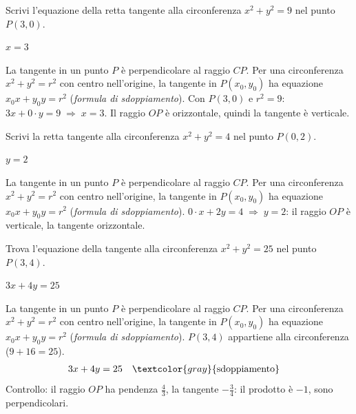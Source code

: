 \begin{question}[ID=4.1, subtitle={Tangente a $x^2+y^2=9$ nel punto $P(3,0)$}, difficulty=facile, tags={tangente, circonferenza, punto}]
Scrivi l'equazione della retta tangente alla circonferenza $x^2+y^2=9$ nel punto $P(3,0)$.
\begin{solution}
$x=3$
\end{solution}
\begin{explanation}
La tangente in un punto $P$ è perpendicolare al raggio $CP$. Per una circonferenza $x^2+y^2=r^2$ con centro nell'origine, la tangente in $P(x_0,y_0)$ ha equazione $x_0x+y_0y=r^2$ (\emph{formula di sdoppiamento}).
Con $P(3,0)$ e $r^2=9$: \ $3x+0\cdot y=9 \;\Rightarrow\; x=3$. Il raggio $OP$ è orizzontale, quindi la tangente è verticale.
\end{explanation}
\end{question}


\begin{question}[ID=4.2, subtitle={Tangente a $x^2+y^2=4$ nel punto $P(0,2)$}, difficulty=facile, tags={tangente, circonferenza}]
Scrivi la retta tangente alla circonferenza $x^2+y^2=4$ nel punto $P(0,2)$.
\begin{solution}
$y=2$
\end{solution}
\begin{explanation}
La tangente in un punto $P$ è perpendicolare al raggio $CP$. Per una circonferenza $x^2+y^2=r^2$ con centro nell'origine, la tangente in $P(x_0,y_0)$ ha equazione $x_0x+y_0y=r^2$ (\emph{formula di sdoppiamento}).
$0\cdot x+2y=4 \;\Rightarrow\; y=2$: il raggio $OP$ è verticale, la tangente orizzontale.
\end{explanation}
\end{question}


\begin{question}[ID=4.3, subtitle={Tangente a $x^2+y^2=25$ nel punto $P(3,4)$}, difficulty=media, tags={tangente, circonferenza}]
Trova l'equazione della tangente alla circonferenza $x^2+y^2=25$ nel punto $P(3,4)$.
\begin{solution}
$3x+4y=25$
\end{solution}
\begin{explanation}
La tangente in un punto $P$ è perpendicolare al raggio $CP$. Per una circonferenza $x^2+y^2=r^2$ con centro nell'origine, la tangente in $P(x_0,y_0)$ ha equazione $x_0x+y_0y=r^2$ (\emph{formula di sdoppiamento}).
$P(3,4)$ appartiene alla circonferenza ($9+16=25$).
\[\begin{aligned}
3x+4y &= 25 && \textcolor{gray}{\text{sdoppiamento}}
\end{aligned}\]
Controllo: il raggio $OP$ ha pendenza $\tfrac43$, la tangente $-\tfrac34$: il prodotto è $-1$, sono perpendicolari.
\end{explanation}
\end{question}

